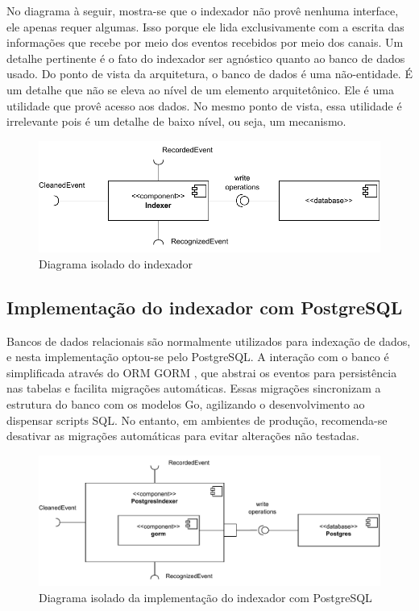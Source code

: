 \documentclass[12pt, %
openright, 
oneside, %
a4paper,    %
brazil]{facom-ufu-abntex2}
\begin{document}
No diagrama à seguir, mostra-se que o indexador não provê nenhuma interface,
ele apenas requer algumas. Isso porque ele lida exclusivamente com a escrita
das informações que recebe por meio dos eventos recebidos por meio dos canais.
Um detalhe pertinente é o fato do indexador ser agnóstico quanto ao banco de
dados usado. Do ponto de vista da arquitetura, o banco de dados é uma
não-entidade. É um detalhe que não se eleva ao nível de um elemento
arquitetônico. Ele é uma utilidade que provê acesso aos dados. No mesmo ponto
de vista, essa utilidade é irrelevante pois é um detalhe de baixo nível, ou
seja, um mecanismo. \cite{martin2018clean}

\begin{figure}[!ht]
	\centering
	\includegraphics[width=0.8\linewidth]{indexer.pdf}
	\caption[Diagrama isolado do indexador]{Diagrama isolado do indexador}
	\label{fig:graficosVariandoTamanhoRede}
\end{figure}

\subsection{Implementação do indexador com PostgreSQL}
Bancos de dados relacionais são normalmente utilizados para indexação de dados,
e nesta implementação optou-se pelo PostgreSQL. A interação com o banco é
simplificada através do ORM GORM \cite{gorm}, que abstrai os eventos para
persistência nas tabelas e facilita migrações automáticas. Essas migrações
sincronizam a estrutura do banco com os modelos Go, agilizando o
desenvolvimento ao dispensar scripts SQL. No entanto, em ambientes de produção,
recomenda-se desativar as migrações automáticas para evitar alterações não
testadas.

\begin{figure}[!ht]
	\centering
	\includegraphics[width=1\linewidth]{postgres_indexer.pdf}
	\caption[Diagrama isolado da implementação do indexador com
		PostgreSQL]{Diagrama isolado da implementação do indexador com PostgreSQL}
	\label{fig:graficosVariandoTamanhoRede}
\end{figure}
\end{document}
